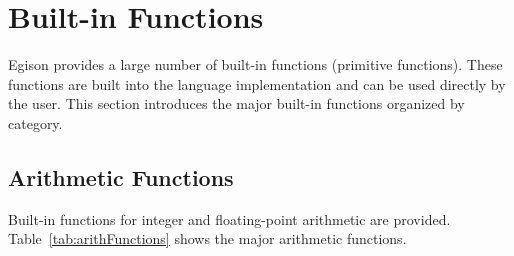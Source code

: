 \section{Built-in Functions}

Egison provides a large number of built-in functions (primitive functions).
These functions are built into the language implementation and can be used directly by the user.
This section introduces the major built-in functions organized by category.

\subsection{Arithmetic Functions}

Built-in functions for integer and floating-point arithmetic are provided.
Table~\ref{tab:arithFunctions} shows the major arithmetic functions.

